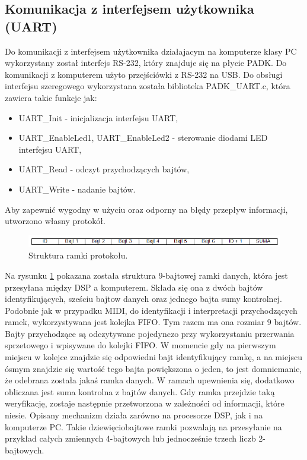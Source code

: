 \subsection{Komunikacja z interfejsem użytkownika (UART)}
Do komunikacji z interfejsem użytkownika działajacym na komputerze klasy PC wykorzystany został interfejs RS-232, który znajduje się na płycie PADK. Do komunikacji z komputerem użyto przejściówki z RS-232 na USB. 
Do obsługi interfejsu szeregowego wykorzystana została biblioteka PADK\_UART.c, która zawiera takie funkcje jak:
\begin{itemize}
	\item UART\_Init - inicjalizacja interfejsu UART,
	\item UART\_EnableLed1, UART\_EnableLed2 - sterowanie diodami LED interfejsu UART,
	\item UART\_Read - odczyt przychodzących bajtów,
	\item UART\_Write - nadanie bajtów.
\end{itemize}
Aby zapewnić wygodny w użyciu oraz odporny na błędy przepływ informacji, utworzono własny protokół.
\begin{figure}[H]
	\centering
	\includegraphics[width=16cm]{./grafiki/real_uartframe}
	\captionsetup{justification=centering}
	\caption{Struktura ramki protokołu.}
	\label{rys:real_uartframe}
\end{figure}
Na rysunku \ref{rys:real_uartframe} pokazana została struktura 9-bajtowej ramki danych, która jest przesyłana między DSP a komputerem. Składa się ona z dwóch bajtów identyfikujących, sześciu bajtow danych oraz jednego bajta sumy kontrolnej. Podobnie jak w przypadku MIDI, do identyfikacji i interpretacji przychodzących ramek, wykorzystywana jest kolejka FIFO. Tym razem ma ona rozmiar 9 bajtów. Bajty przychodzące są odczytywane pojedynczo przy wykorzystaniu przerwania sprzetowego i wpisywane do kolejki FIFO. W momencie gdy na pierwszym miejscu w kolejce znajdzie się odpowiedni bajt identyfikujący ramkę, a na miejscu ósmym znajdzie się wartość tego bajta powiększona o jeden, to jest domniemanie, że odebrana została jakaś ramka danych. W ramach upewnienia się, dodatkowo obliczana jest suma kontrolna z bajtów danych. Gdy ramka przejdzie taką weryfikację, zostaje następnie przetworzona w zależności od informacji, które niesie. Opisany mechanizm działa zarówno na procesorze DSP, jak i na komputerze PC.
Takie dziewięciobajtowe ramki pozwalają na przesyłanie na przykład całych zmiennych 4-bajtowych lub jednocześnie trzech liczb 2-bajtowych. 
